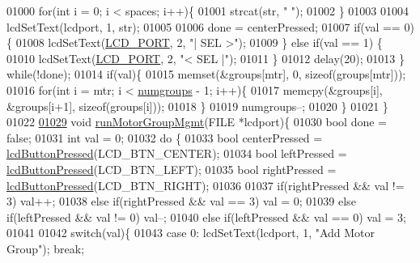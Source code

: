 \begin{DoxyCode}
{{{{{{{{{{{{{{01000         \textcolor{keywordflow}{for}(\textcolor{keywordtype}{int} i = 0; i < spaces; i++)\{
01001             strcat(str, \textcolor{stringliteral}{" "});
01002         \}
01003 
01004         lcdSetText(lcdport, 1, str);
01005 
01006         done = centerPressed;
01007         \textcolor{keywordflow}{if}(val == 0)\{
01008             lcdSetText(\hyperlink{lcdmsg_8h_abcf42bd88b3c36193f301ca25b033875}{LCD\_PORT}, 2, \textcolor{stringliteral}{"|      SEL     >"});
01009         \} \textcolor{keywordflow}{else} \textcolor{keywordflow}{if}(val == 1) \{
01010             lcdSetText(\hyperlink{lcdmsg_8h_abcf42bd88b3c36193f301ca25b033875}{LCD\_PORT}, 2, \textcolor{stringliteral}{"<      SEL     |"});
01011         \}
01012         delay(20);
01013     \} \textcolor{keywordflow}{while}(!done);
01014     \textcolor{keywordflow}{if}(val)\{
01015         memset(&groups[mtr], 0, \textcolor{keyword}{sizeof}(groups[mtr]));
01016         \textcolor{keywordflow}{for}(\textcolor{keywordtype}{int} i = mtr; i < \hyperlink{lcddiag_8c_a205f1cedec1664555276e0a71a1c87d8}{numgroups} - 1; i++)\{
01017             memcpy(&groups[i], &groups[i+1], \textcolor{keyword}{sizeof}(groups[i]));
01018         \}
01019         numgroups--;
01020     \}
01021 \}
01022 
\hypertarget{lcddiag_8c_source.tex_l01029}{}\hyperlink{lcddiag_8c_a9c8ce3f638a12bc9a264dd447be96a6d}{01029} \textcolor{keywordtype}{void} \hyperlink{lcddiag_8c_a9c8ce3f638a12bc9a264dd447be96a6d}{runMotorGroupMgmt}(FILE *lcdport)\{
01030     \textcolor{keywordtype}{bool} done = \textcolor{keyword}{false};
01031     \textcolor{keywordtype}{int} val = 0;
01032     \textcolor{keywordflow}{do} \{
01033         \textcolor{keywordtype}{bool} centerPressed = \hyperlink{lcddiag_8h_a74e4c744db49f9b7b645095575e152ad}{lcdButtonPressed}(LCD\_BTN\_CENTER);
01034         \textcolor{keywordtype}{bool} leftPressed = \hyperlink{lcddiag_8h_a74e4c744db49f9b7b645095575e152ad}{lcdButtonPressed}(LCD\_BTN\_LEFT);
01035         \textcolor{keywordtype}{bool} rightPressed = \hyperlink{lcddiag_8h_a74e4c744db49f9b7b645095575e152ad}{lcdButtonPressed}(LCD\_BTN\_RIGHT);
01036 
01037         \textcolor{keywordflow}{if}(rightPressed && val != 3) val++;
01038         \textcolor{keywordflow}{else} \textcolor{keywordflow}{if}(rightPressed && val == 3) val = 0;
01039         \textcolor{keywordflow}{else} \textcolor{keywordflow}{if}(leftPressed && val != 0) val--;
01040         \textcolor{keywordflow}{else} \textcolor{keywordflow}{if}(leftPressed && val == 0) val = 3;
01041 
01042         \textcolor{keywordflow}{switch}(val)\{
01043             \textcolor{keywordflow}{case} 0: lcdSetText(lcdport, 1, \textcolor{stringliteral}{"Add Motor Group"}); \textcolor{keywordflow}{break};
}}}}}}}}}}}}}}
\end{DoxyCode}
